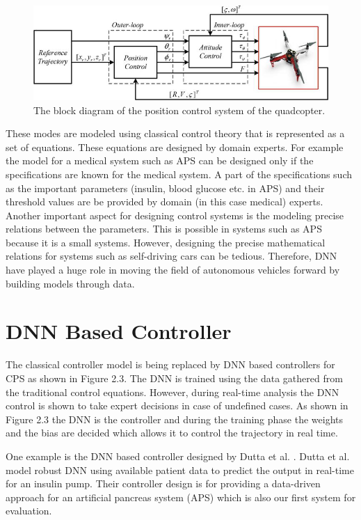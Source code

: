 \begin{figure}
	\centering
	\includegraphics[width=0.7\linewidth]{Images/controltheory}
	\caption{The block diagram of the position control system of the quadcopter.
	}
	\label{fig:controltheory}
\end{figure}


These modes are modeled using classical control theory that is represented as a set of equations. These equations are designed by domain experts. For example the model for a medical system such as \ac{APS} can be designed only if the specifications are known for the medical system. A part of the specifications such as the important parameters (insulin, blood glucose etc. in APS) and their threshold values are be provided by domain (in this case medical) experts. Another important aspect for designing control systems is the  modeling precise relations between the parameters. This is possible in systems such as APS because it is a small systems. However, designing the precise mathematical relations for systems such as self-driving cars can be tedious. Therefore, \ac{DNN} have played a huge role in moving the field of autonomous vehicles forward by building models through data. 

  



\section{DNN Based Controller}
The classical controller model is being replaced by DNN based controllers for CPS as shown in  Figure 2.3. The DNN is trained using the data gathered from the traditional control equations. However, during real-time analysis the DNN control is shown to take expert decisions in case of undefined cases. As shown in Figure 2.3 the DNN is the controller and during the training phase the weights and the bias are decided which allows it to control the trajectory in real time. 

One example is the DNN based controller designed by Dutta et al. \cite{Dutta_Others__2018__Robust}. Dutta et al. model robust DNN using available patient data to predict the output in real-time for an insulin pump. Their controller design is for providing a data-driven approach for an artificial pancreas system (APS) which is also our first system for evaluation. 

